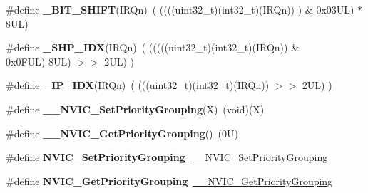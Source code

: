 \begin{DoxyCompactItemize}
\#define {\bfseries \+\_\+\+B\+I\+T\+\_\+\+S\+H\+I\+FT}(I\+R\+Qn)~(  ((((uint32\+\_\+t)(int32\+\_\+t)(I\+R\+Qn))         )      \&  0x03\+U\+L) $\ast$ 8\+U\+L)
\item 
\mbox{\label{group___c_m_s_i_s___core___n_v_i_c_functions_gaee4f7eb5d7e770ad51489dbceabb1755}} 
\#define {\bfseries \+\_\+\+S\+H\+P\+\_\+\+I\+DX}(I\+R\+Qn)~( (((((uint32\+\_\+t)(int32\+\_\+t)(I\+R\+Qn)) \& 0x0\+F\+U\+L)-\/8\+U\+L) $>$$>$    2\+U\+L)      )
\item 
\mbox{\label{group___c_m_s_i_s___core___n_v_i_c_functions_ga370ec4b1751a6a889d849747df3763a9}} 
\#define {\bfseries \+\_\+\+I\+P\+\_\+\+I\+DX}(I\+R\+Qn)~(   (((uint32\+\_\+t)(int32\+\_\+t)(I\+R\+Qn))                $>$$>$    2\+U\+L)      )
\item 
\mbox{\label{group___c_m_s_i_s___core___n_v_i_c_functions_ga6834dd8c9c59394f1b544b57665293a4}} 
\#define {\bfseries \+\_\+\+\_\+\+N\+V\+I\+C\+\_\+\+Set\+Priority\+Grouping}(X)~(void)(X)
\item 
\mbox{\label{group___c_m_s_i_s___core___n_v_i_c_functions_gab2072fe50f6d7cd208f6768919f59fae}} 
\#define {\bfseries \+\_\+\+\_\+\+N\+V\+I\+C\+\_\+\+Get\+Priority\+Grouping}()~(0\+U)
\item 
\mbox{\label{group___c_m_s_i_s___core___n_v_i_c_functions_ga0e798d5aec68cdd8263db86a76df788f}} 
\#define {\bfseries N\+V\+I\+C\+\_\+\+Set\+Priority\+Grouping}~\hyperlink{group___c_m_s_i_s___core___n_v_i_c_functions_gafc94dcbaee03e4746ade1f5bb9aaa56d}{\+\_\+\+\_\+\+N\+V\+I\+C\+\_\+\+Set\+Priority\+Grouping}
\item 
\mbox{\label{group___c_m_s_i_s___core___n_v_i_c_functions_ga4eeb9214f2264fc23c34ad5de2d3fa11}} 
\#define {\bfseries N\+V\+I\+C\+\_\+\+Get\+Priority\+Grouping}~\hyperlink{group___c_m_s_i_s___core___n_v_i_c_functions_ga9b894af672df4373eb637f8288845c05}{\+\_\+\+\_\+\+N\+V\+I\+C\+\_\+\+Get\+Priority\+Grouping}
\item 
\mbox{\label{group___c_m_s_i_s___core___n_v_i_c_functions_ga57b3064413dbc7459d9646020fdd8bef}} 

\end{DoxyCompactItemize}
